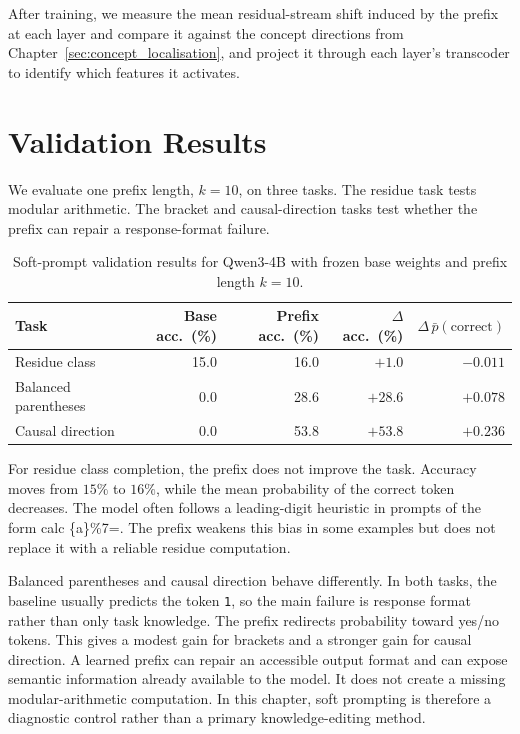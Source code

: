 After training, we measure the mean residual-stream shift induced by the prefix at each layer and compare it against the concept directions from Chapter~\ref{sec:concept_localisation}, and project it through each layer's transcoder to identify which features it activates.

\section{Validation Results}
\label{sec:soft_prompt_results}

We evaluate one prefix length, $k=10$, on three tasks. The residue task tests modular arithmetic. The bracket and causal-direction tasks test whether the prefix can repair a response-format failure.

\begin{table}[ht!]
\centering
\small
\begin{tabular}{@{}lrrrr@{}}
\toprule
Task & Base acc.\ (\%) & Prefix acc.\ (\%) & $\Delta$ acc.\ (\%) & $\Delta\,\bar{p}(\mathrm{correct})$ \\
\midrule
Residue class        & 15.0 & 16.0 & $+1.0$  & $-0.011$ \\
Balanced parentheses &  0.0 & 28.6 & $+28.6$ & $+0.078$ \\
Causal direction     &  0.0 & 53.8 & $+53.8$ & $+0.236$ \\
\bottomrule
\end{tabular}
\caption{Soft-prompt validation results for Qwen3-4B with frozen base weights and prefix length $k=10$.}
\label{tab:sp_summary}
\end{table}

For residue class completion, the prefix does not improve the task. Accuracy moves from $15\%$ to $16\%$, while the mean probability of the correct token decreases. The model often follows a leading-digit heuristic in prompts of the form {\sffamily\small calc \{a\}\%7=}. The prefix weakens this bias in some examples but does not replace it with a reliable residue computation.

Balanced parentheses and causal direction behave differently. In both tasks, the baseline usually predicts the token \texttt{1}, so the main failure is response format rather than only task knowledge. The prefix redirects probability toward yes/no tokens. This gives a modest gain for brackets and a stronger gain for causal direction. A learned prefix can repair an accessible output format and can expose semantic information already available to the model. It does not create a missing modular-arithmetic computation. In this chapter, soft prompting is therefore a diagnostic control rather than a primary knowledge-editing method.
